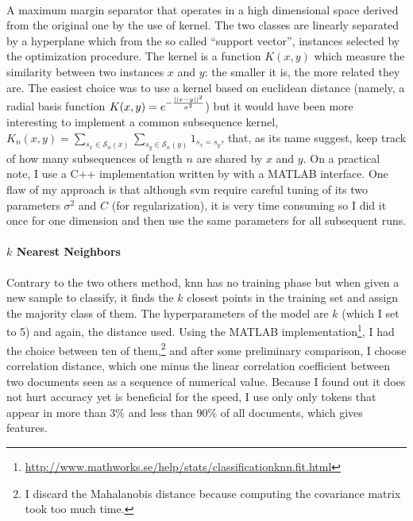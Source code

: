 \paragraph{}

A maximum margin separator that operates in a high dimensional space derived from the original one by the use of kernel. The two classes are linearly separated by a hyperplane which from the so called \enquote{support vector}, instances selected by the optimization procedure. The kernel is a function $K(x,y)$ which measure the similarity between two instances $x$ and $y$: the smaller it is, the more related they are. The easiest choice was to use a kernel based on euclidean distance (namely, a radial basis function $K(x,y)=e^{-\frac{\left|\left|x-y\right|\right|^2}{\sigma^2}}$) but it would have been more interesting to implement a common subsequence kernel\autocite{Lodhi2002kernel}, $K_n(x,y)=\sum_{s_x\in\mathcal{S}_n(x)}\sum_{s_y\in\mathcal{S}_n(y)}1_{s_x=s_y}$, that, as its name suggest, keep track of how many subsequences of length $n$ are shared by $x$ and $y$. On a practical note, I use a C++ implementation written by \textcite{Chang2001libsvm} with a MATLAB interface. One flaw of my approach is that although \gls{svm} require careful tuning of its two parameters $\sigma^2$ and $C$ (for regularization), it is very time consuming so I did it once for one dimension and then use the same parameters for all subsequent runs.

\paragraph{$k$ Nearest Neighbors}
Contrary to the two others method, \gls{knn} has no training phase but when given a new sample to classify, it finds the $k$ closest points in the training set and assign the majority class of them. The hyperparameters of the model are $k$ (which I set to 5) and again, the distance used. Using the MATLAB implementation\footnote{\href{http://www.mathworks.se/help/stats/classificationknn.fit.html}{http://www.mathworks.se/help/stats/classificationknn.fit.html}}, I had the choice between ten of them,\footnote{I discard the Mahalanobis distance because computing the covariance matrix took too much time.} and after some preliminary comparison, I choose correlation distance, which one minus the linear correlation coefficient between two documents seen as a sequence of numerical value. Because I found out it does not hurt accuracy yet is beneficial for the speed, I use only only tokens that appear in more than 3\% and less than 90\% of all documents, which gives  features.


